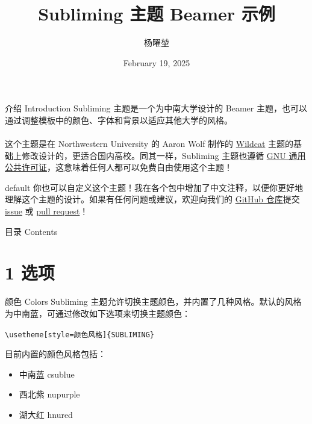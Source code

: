 \documentclass[10pt,aspectratio=169,fontset=none]{ctexbeamer}
\title{Subliming 主题 Beamer 示例}
\author{杨曜堃}
\institute{地球科学与信息物理学院}
\date{February 19, 2025}
\begin{document}
    \begin{frame}
        \titlepage
    \end{frame}

    \begin{frame}{介绍 Introduction}
        Subliming 主题是一个为中南大学设计的 Beamer 主题，也可以通过调整模板中的颜色、字体和背景以适应其他大学的风格。 
        \\ ~ \\
        这个主题是在 Northwestern University 的 Aaron Wolf 制作的 \href{https://github.com/aarondwolf/wildcatwildcat}{Wildcat} 主题的基础上修改设计的，更适合国内高校。同其一样，Subliming 主题也遵循 \href{http://www.gnu.org/licenses/}{GNU 通用公共许可证}，这意味着任何人都可以免费自由使用这个主题！
        
        \begin{tbox}{default}
            你也可以自定义这个主题！我在各个包中增加了中文注释，以便你更好地理解这个主题的设计。如果有任何问题或建议，欢迎向我们的 \href{https://github.com/PourRevenir/Subliming}{GitHub 仓库}提交 \href{https://github.com/PourRevenir/Subliming/issues}{issue} 或 \href{https://github.com/PourRevenir/Subliming/pulls}{pull request}！
        \end{tbox}
    \end{frame}

    \begin{frame}{目录 Contents}
        \tableofcontents
    \end{frame}

    \section{1 选项}

    \begin{frame}{颜色 Colors}
        Subliming 主题允许切换主题颜色，并内置了几种风格。默认的风格为中南蓝，可通过修改如下选项来切换主题颜色：
        
        \begin{center}
            \texttt{\textcolor{primary}{\textbackslash usetheme}[style=颜色风格]\alert{\{SUBLIMING\}}}
        \end{center}
        
        目前内置的颜色风格包括：

       \begin{itemize}
            \item \textcolor[HTML]{186199}{中南蓝 csublue}
            \item \textcolor[RGB]{078, 042, 132}{西北紫 nupurple}
            \item \textcolor[HTML]{A00000}{湖大红 hnured}
        \end{itemize}  
       
    \end{frame}
    
\end{document}
